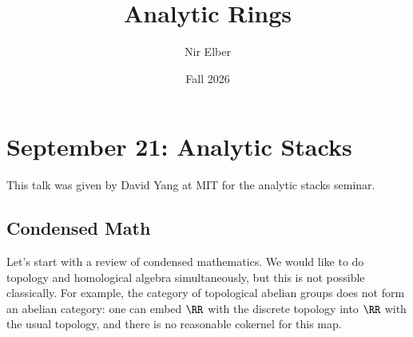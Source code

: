 \documentclass{article}
\title{Analytic Rings}
\author{Nir Elber}
\date{Fall 2026}
\begin{document}
\maketitle

\tableofcontents

\section{September 21: Analytic Stacks}
This talk was given by David Yang at MIT for the analytic stacks seminar.

\subsection{Condensed Math}
Let's start with a review of condensed mathematics. We would like to do topology and homological algebra simultaneously, but this is not possible classically. For example, the category of topological abelian groups does not form an abelian category: one can embed $\RR$ with the discrete topology into $\RR$ with the usual topology, and there is no reasonable cokernel for this map.
\end{document}
